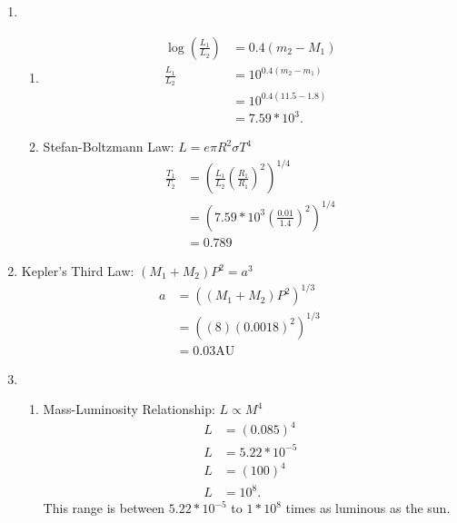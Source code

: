\documentclass{article}
\begin{document}
\begin{enumerate}
\begin{enumerate}
    \end{enumerate}
    
    \item
    
    \begin{enumerate}
        \item 
        
        \begin{align*}
            \log(\frac{L_1}{L_2}) &= 0.4(m_2-M_1)\\
            \frac{L_1}{L_2} &= 10^{0.4(m_2-m_1)}\\
            &= 10^{0.4(11.5-1.8)}\\
            &= 7.59*10^3.
        \end{align*}
        
        \item
        
        Stefan-Boltzmann Law: $L=e\pi R^2\sigma T^4$
        \begin{align*}
            \frac{T_1}{T_2} &= (\frac{L_1}{L_2}(\frac{R_1}{R_1})^2)^{1/4}\\
            &= (7.59*10^3(\frac{0.01}{1.4})^2)^{1/4}\\
            &= 0.789
        \end{align*}
        
    \end{enumerate}
    
    \item
    
    Kepler's Third Law: $(M_1+M_2)P^2 = a^3$
    \begin{align*}
        a &= ((M_1+M_2)P^2)^{1/3}\\
        &= ((8)(0.0018)^2)^{1/3}\\
        &= 0.03 \text{AU}
    \end{align*}
    
    \item
    
    \begin{enumerate}
        \item 
        
        Mass-Luminosity Relationship: $L\propto M^4$
        \begin{align*}
            L &= (0.085)^4\\
            L &= 5.22*10^{-5}\\
            L &= (100)^4\\
            L &= 10^8.
        \end{align*}
        This range is between $5.22*10^{-5}$ to $1*10^8$ times as luminous as the sun.
        

\end{enumerate}
\end{enumerate}
\end{document}
